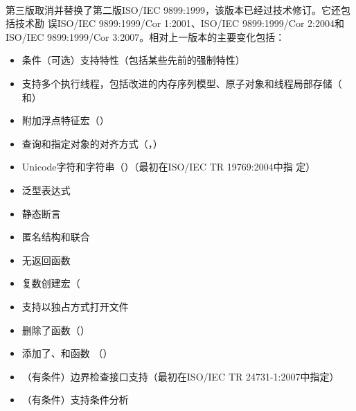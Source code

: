 \paragraph{}
第三版取消并替换了第二版ISO/IEC 9899:1999，该版本已经过技术修订。它还包括技术勘
误ISO/IEC 9899:1999/Cor 1:2001、ISO/IEC 9899:1999/Cor 2:2004和
ISO/IEC 9899:1999/Cor 3:2007。相对上一版本的主要变化包括：
\begin{itemize}
  \item{条件（可选）支持特性（包括某些先前的强制特性）}
  \item{支持多个执行线程，包括改进的内存序列模型、原子对象和线程局部存储（
    和）}
  \item{附加浮点特征宏（）}
  \item{查询和指定对象的对齐方式（，）}
  \item{Unicode字符和字符串（）（最初在ISO/IEC TR 19769:2004中指
    定）}
  \item{泛型表达式}
  \item{静态断言}
  \item{匿名结构和联合}
  \item{无返回函数}
  \item{复数创建宏（}
  \item{支持以独占方式打开文件}
  \item{删除了函数（）}
  \item{添加了、和函数
    （）}
  \item{（有条件）边界检查接口支持（最初在ISO/IEC TR 24731-1:2007中指定）}
  \item{（有条件）支持条件分析}
\end{itemize}

